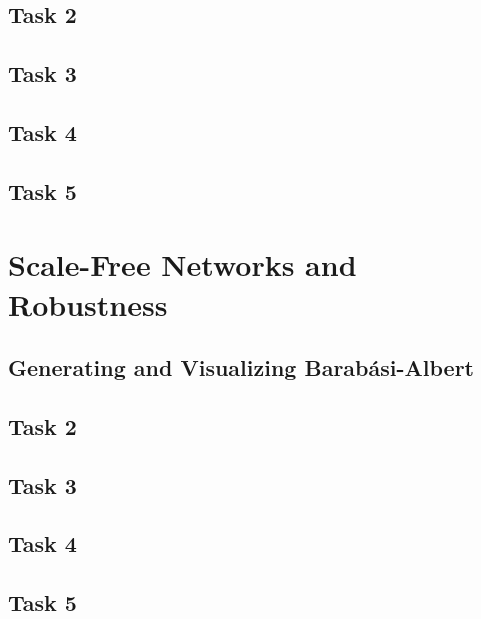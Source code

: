 \documentclass{scrartcl}
\begin{document}
\subsection{Task 2}
\subsection{Task 3}
\subsection{Task 4}
\subsection{Task 5}

\section{Scale-Free Networks and Robustness}
\subsection{Generating and Visualizing Barab\'asi-Albert}
\subsection{Task 2}
\subsection{Task 3}
\subsection{Task 4}
\subsection{Task 5}
\end{document}
